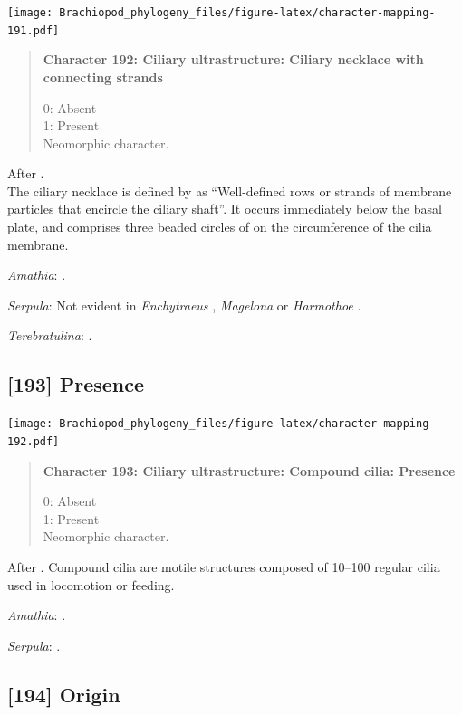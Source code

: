 \documentclass[openany]{book}
\begin{document}
\texttt{[image: Brachiopod\_phylogeny\_files/figure-latex/character-mapping-191.pdf]}

\begin{quote}
\textbf{Character 192: Ciliary ultrastructure: Ciliary necklace with
connecting strands}

0: Absent\\
1: Present\\
Neomorphic character.
\end{quote}

After \citet{Lundin2009}.\\
The ciliary necklace is defined by \citet{Gilula1972} as ``Well-defined
rows or strands of membrane particles that encircle the ciliary shaft''.
It occurs immediately below the basal plate, and comprises three beaded
circles of on the circumference of the cilia membrane.

\hypertarget{Amathia-coding-192}{}
\emph{Amathia}: \citet{Reed1982}.

\hypertarget{Serpula-coding-192}{}
\emph{Serpula}: Not evident in \emph{Enchytraeus} \citep{Reger1967},
\emph{Magelona} \citep{Bartolomaeus1995} or \emph{Harmothoe}
\citep{Holborow1969}.

\hypertarget{Terebratulina-coding-192}{}
\emph{Terebratulina}: \citep{Luter1995}.

\subsection*{{[}193{]} Presence}\label{presence-4}

\texttt{[image: Brachiopod\_phylogeny\_files/figure-latex/character-mapping-192.pdf]}

\begin{quote}
\textbf{Character 193: Ciliary ultrastructure: Compound cilia: Presence}

0: Absent\\
1: Present\\
Neomorphic character.
\end{quote}

After \citet{Lundin2009}. Compound cilia are motile structures composed
of 10--100 regular cilia used in locomotion or feeding.

\hypertarget{Amathia-coding-193}{}
\emph{Amathia}: \citet{Reed1982}.

\hypertarget{Serpula-coding-193}{}
\emph{Serpula}: \citet{Nielsen1987}.

\subsection*{{[}194{]} Origin}\label{origin-1}
\end{document}
